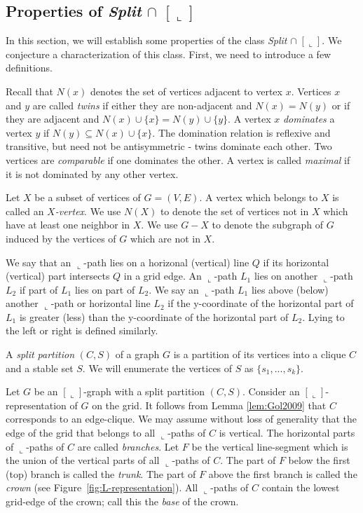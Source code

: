 \documentclass[11pt,3p,times]{elsarticle}
\newcommand{\La}{\ensuremath{\llcorner}} \newcommand{\Lb}{\ensuremath{\ulcorner}} \newcommand{\Lc}{\ensuremath{\lrcorner}} \newcommand{\Ld}{\ensuremath{\urcorner}}
\begin{document}
\subsection{Properties of {\em Split} $\cap$ $[\La]$}
\label{sec:properties-of-split}
In this section, we will establish some properties of the class
{\em Split} $ \cap \; [\La]$. We conjecture a
characterization of this class. First, we need to introduce a few
definitions.

Recall that $N(x)$ denotes the set of vertices adjacent to vertex $x$.
Vertices $x$ and $y$ are called {\em twins} if either they are non-adjacent
and $N(x)=N(y)$ or if they are adjacent and $N(x) \cup \{x\} = N(y) \cup \{y\}$.
A vertex $x$ {\em dominates} a vertex $y$ if $N(y) \subseteq N(x)
\cup \{x\}$. The domination relation is reflexive and transitive, but need not be
antisymmetric - twins dominate each other.   Two vertices are
{\em comparable} if one dominates the other. A vertex is called {\em maximal}
if it is not dominated by any other vertex.

Let $X$ be a subset of vertices of $G=(V,E)$. A vertex which belongs
to $X$ is called an {\em $X$-vertex}. We use $N(X)$ to denote the set of
vertices not in $X$ which have at least one neighbor in $X$.  We use $G-X$  to denote the
subgraph of $G$ induced by the vertices of $G$ which are not in $X$.


We say that an $\La$-path lies on a horizonal (vertical) line $Q$ if its horizontal (vertical) part
intersects $Q$ in a grid edge. An $\La$-path $L_1$ lies on another $\La$-path $L_2$ if part of $L_1$
lies on part of $L_2$. We say an $\La$-path $L_1$ lies above (below) another $\La$-path or horizontal
line $L_2$ if the y-coordinate of the horizontal part of $L_1$ is greater (less) than the y-coordinate
of the horizontal part of $L_2$. Lying to the left or right is defined similarly.

A {\em split partition} $(C,S)$ of a graph $G$ is a partition of
its vertices into a clique $C$ and a stable set $S$. We will
enumerate the vertices of $S$ as $\{s_1, ..., s_k\}$.

Let $G$ be an $[\La]$-graph  with a split partition $(C,S)$. Consider an
$[\La]$-representation of $G$ on the grid. It
follows from Lemma \ref{lem:Gol2009} that $C$ corresponds to an
edge-clique. We may assume without loss of generality that the edge of
the grid that belongs to all $\La$-paths of $C$ is vertical. The horizontal
parts of $\La$-paths of $C$ are called {\em branches}. Let $F$ be the vertical
line-segment which is the union of the vertical parts of all $\La$-paths of $C$.
The part of $F$ below the first (top) branch is called the {\em trunk}. The
part of $F$ above the first branch is called the {\em
crown} (see Figure~\ref{fig:L-representation}). All $\La$-paths of $C$ contain the
lowest grid-edge of the crown; call this the {\em base} of the crown.
\end{document}
